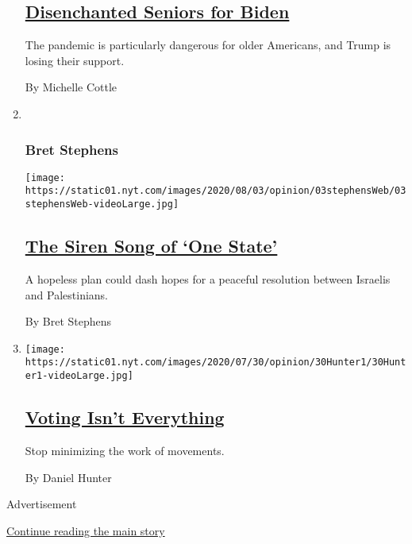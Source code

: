 \begin{enumerate}
{  \subsection{\texorpdfstring{\href{/2020/08/03/opinion/senior-voters-biden-trump-2020.html}{Disenchanted
  Seniors for
  Biden}}{Disenchanted Seniors for Biden}}\label{disenchanted-seniors-for-biden}}

  The pandemic is particularly dangerous for older Americans, and Trump
  is losing their support.

  By Michelle Cottle
\item ~
  \hypertarget{bret-stephens}{%
  \subsubsection{Bret Stephens}\label{bret-stephens}}

  \texttt{[image: https://static01.nyt.com/images/2020/08/03/opinion/03stephensWeb/03stephensWeb-videoLarge.jpg]}

  \hypertarget{the-siren-song-of-one-state}{%
  \subsection{\texorpdfstring{\href{/2020/08/03/opinion/israel-palestine-one-state-solution.html}{The
  Siren Song of `One
  State'}}{The Siren Song of `One State'}}\label{the-siren-song-of-one-state}}

  A hopeless plan could dash hopes for a peaceful resolution between
  Israelis and Palestinians.

  By Bret Stephens
\item
  \texttt{[image: https://static01.nyt.com/images/2020/07/30/opinion/30Hunter1/30Hunter1-videoLarge.jpg]}

  \hypertarget{voting-isnt-everything}{%
  \subsection{\texorpdfstring{\href{/2020/08/04/opinion/voting-2020-election-blm-movement.html}{Voting
  Isn't
  Everything}}{Voting Isn't Everything}}\label{voting-isnt-everything}}

  Stop minimizing the work of movements.

  By Daniel Hunter
\end{enumerate}

Advertisement

\protect\hyperlink{after-mid1}{Continue reading the main story}

